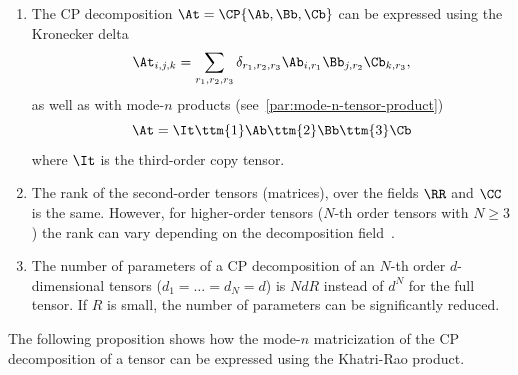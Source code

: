 \begin{remark}
\begin{enumerate}
\item The CP decomposition $\At = \CP{\Ab,\Bb,\Cb}$ can be expressed using the Kronecker delta 
$$\At_{i,j,k} = \sum_{r_1,r_2,r_3}\delta_{r_1,r_2,r_3}\Ab_{i,r_1}\Bb_{j,r_2}\Cb_{k,r_3},$$
as well as with mode-$n$ products (see~\ref{par:mode-n-tensor-product}) 
$$\At = \It\ttm{1}\Ab\ttm{2}\Bb\ttm{3}\Cb$$
where $\It$ is the third-order copy tensor. 
\item The rank of the second-order tensors (matrices), over the fields $\RR$ and $\CC$ is the same. However, for higher-order tensors ($N$-th order tensors with $N\geq3$) the rank can vary depending on the decomposition field~\citep{kruskal1989rank}.
\item The number of parameters of a CP decomposition of an $N$-th order $d$-dimensional tensors ($d_1 = \dots = d_N = d$) is $NdR$ instead of $d^N$ for the full tensor. If $R$ is small, the number of parameters can be significantly reduced. 
\end{enumerate}
\end{remark}
The following proposition shows how the mode-$n$ matricization of the CP decomposition of a tensor can be expressed using the Khatri-Rao product.
